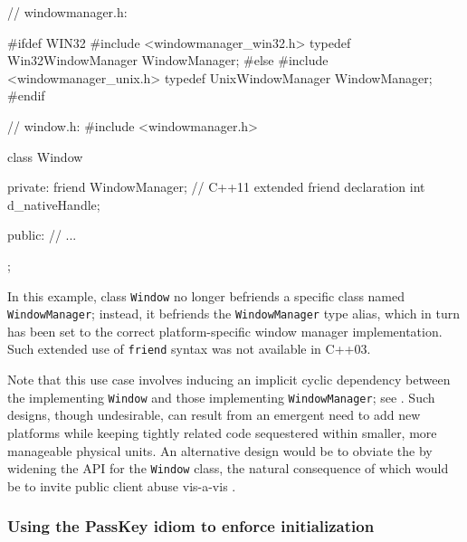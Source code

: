 \vspace*{2ex}

\begin{emcppslisting}[emcppsbatch=e1]
// windowmanager.h:

#ifdef WIN32
#include <windowmanager_win32.h>
typedef Win32WindowManager WindowManager;
#else
#include <windowmanager_unix.h>
typedef UnixWindowManager WindowManager;
#endif
\end{emcppslisting}

\vspace*{2ex}

\begin{emcppslisting}[emcppsbatch=e1]
// window.h:
#include <windowmanager.h>

class Window
{
private:
    friend WindowManager;  // C++11 extended friend declaration
    int d_nativeHandle;

public:
    // ...
};
\end{emcppslisting}


In this example, class \lstinline!Window! no longer befriends a specific
class named \lstinline!WindowManager!; instead, it befriends the
\lstinline!WindowManager! type alias, which in turn has been set to the
correct platform-specific window manager implementation. Such extended
use of \lstinline!friend! syntax was not available in C++03.

Note that this use case involves 
inducing an implicit cyclic dependency between the 
implementing \lstinline!Window! and those implementing
\lstinline!WindowManager!; see .
Such designs, though
undesirable, can result from an emergent need to add new platforms while
keeping tightly related code sequestered within smaller, more manageable
physical units. An alternative design would be to obviate the
 by widening the API for the
\lstinline!Window! class, the natural consequence of which would be to
invite public client abuse vis-a-vis .

\subsubsection[Using the \lstinline!PassKey! idiom to enforce initialization]{Using the {\SubsubsecCode PassKey} idiom to enforce initialization}\label{using-the-passkey-idiom-to-enforce-initialization}

